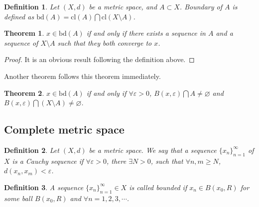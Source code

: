 \documentclass[12pt,leqno]{amsart}
\newtheorem{definition}{Definition}[section]
\newtheorem{theorem}{Theorem}[section]
\theoremstyle{definition}
\numberwithin{equation}{subsection}
\begin{document}
\begin{definition}
Let $(X,d)$ be a metric space, and $A\subset X$. Boundary of $A$ is defined as $\text{bd}(A) =  \text{cl}(A)\bigcap  \text{cl}(X\setminus A)$.
\end{definition}

\medskip

\begin{theorem}
$x\in \text{bd}(A)$ if and only if there exists a sequence in $A$ and a sequence of $X\setminus A$ such that they both converge to $x$.
\end{theorem}
\begin{proof}
It is an obvious result following the definition above.
\end{proof}

Another theorem follows this theorem immediately.

\begin{theorem}
$x\in \text{bd}(A)$ if and only if $\forall \varepsilon > 0$, $B(x,\varepsilon)\bigcap A\neq\varnothing$ and $B(x,\varepsilon)\bigcap (X\setminus A)\neq\varnothing$.
\end{theorem}

\medskip

\subsection{Complete metric space}
\begin{definition}
Let $(X,d)$ be a metric space. We say that a sequence $\{x_n\}^\infty_{n=1}$ of $X$ is a Cauchy sequence if $\forall\varepsilon > 0$, there $\exists N > 0$, such that $\forall n,m \geq N$, $d(x_n,x_m) < \varepsilon$.
\end{definition}

\begin{definition}
A sequence $\{x_n\}^\infty_{n=1}\in X$ is called bounded if $x_n\in B(x_0,R)$ for some ball $B(x_0,R)$ and $\forall n = 1,2,3,\cdots$.
\end{definition}

\medskip
\end{document}
